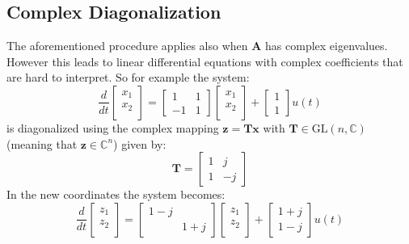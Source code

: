 \documentclass[a4paper,10pt,oneside]{book}
\begin{document}
\subsection{Complex Diagonalization}
The aforementioned procedure applies also when $\mathbf{A}$ has complex eigenvalues. However this leads to linear differential equations with complex coefficients that are hard to interpret. So for example the system:
\begin{equation}
 \frac{d}{dt}\left[ {\begin{array}{c} x_1 \\ x_2 \\  \end{array} } \right] = 
\left[ {\begin{array}{cc}
 1 & 1\\-1 & 1
 \end{array} } \right]\left[ {\begin{array}{c} x_1 \\ x_2 \\  \end{array} } \right] +
\left[ {\begin{array}{c} 1 \\ 1  \end{array} } \right] u(t)
\end{equation} 
is diagonalized using the complex mapping $\mathbf{z}=\mathbf{Tx}$ with $\mathbf{T}\in\text{GL}(n,\mathbb{C})$ (meaning that $\mathbf{z}\in\mathbb{C}^n$) given by:
\begin{equation}
 \mathbf{T}=\left[ {\begin{array}{cc}
 1 & j\\1 & -j
 \end{array} } \right]
\end{equation}
In the new coordinates the system becomes:
\begin{equation}
 \frac{d}{dt}\left[ {\begin{array}{c} z_1 \\ z_2 \\  \end{array} } \right] = 
\left[ {\begin{array}{cc}
 1-j & \\ & 1+j
 \end{array} } \right]\left[ {\begin{array}{c} z_1 \\ z_2 \\  \end{array} } \right] +
\left[ {\begin{array}{c} 1+j \\ 1-j  \end{array} } \right] u(t)
\end{equation} 
\end{document}
